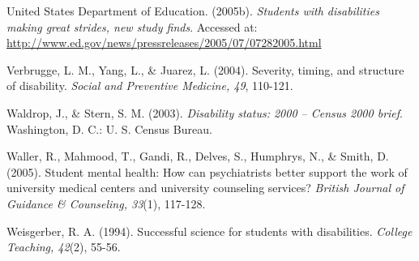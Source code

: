 \documentclass[11.5pt]{sig-alternate} %
\begin{document}
United States Department of Education. (2005b). \textit{Students with disabilities making great strides, new study finds}. Accessed at: \url{http://www.ed.gov/news/pressreleases/2005/07/07282005.html}

Verbrugge, L. M., Yang, L., \& Juarez, L. (2004). Severity, timing, and structure of disability. \textit{Social and Preventive Medicine, 49}, 110-121.

Waldrop, J., \& Stern, S. M. (2003). \textit{Disability status: 2000 – Census 2000 brief}. Washington, D. C.: U. S. Census Bureau.

Waller, R., Mahmood, T., Gandi, R., Delves, S., Humphrys, N., \& Smith, D. (2005). Student mental health: How can psychiatrists better support the work of university medical centers and university counseling services? \textit{British Journal of Guidance \& Counseling, 33}(1), 117-128.

Weisgerber, R. A. (1994). Successful science for students with disabilities. \textit{College Teaching, 42}(2), 55-56.
\end{document}
